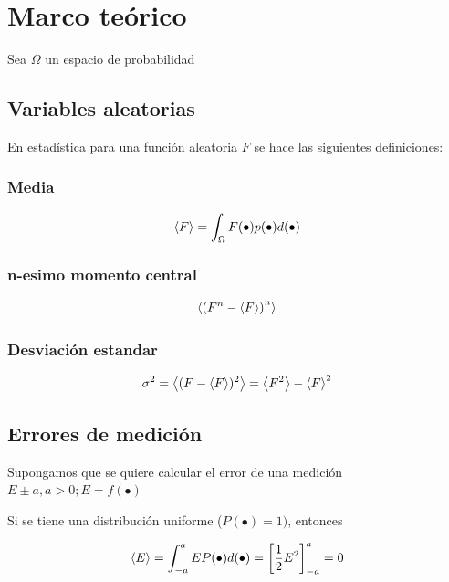 \section{Marco teórico}

Sea $\Omega$ un espacio de probabilidad

\subsection{Variables aleatorias}
En estadística para una función aleatoria $F$ se hace las
siguientes definiciones:

\subsubsection{Media}
\begin{equation}
    \label{eq:media}
    \left\langle F\right\rangle = \int_{\Omega}F(\bullet)p(\bullet)d(\bullet) 
\end{equation}

\subsubsection{n-esimo momento central}

\begin{equation}
    \label{eq:n-momento}
    \left\langle\left(F^n - \left\langle F\right\rangle\right)^n\right\rangle
\end{equation}

\subsubsection{Desviación estandar}
\begin{equation}
    \label{eq:std}
    \sigma^2 = \left\langle(F - \left\langle F\right\rangle)^2\right\rangle = \left\langle F^2\right\rangle - \left\langle F\right\rangle^2 
\end{equation}

\subsection{Errores de medición}
Supongamos que se quiere calcular el error de una medición
$E \pm a, a > 0; E = f(\bullet)$

Si se tiene una distribución uniforme ($P(\bullet) = 1)$, entonces

\begin{equation*}
    \left\langle E\right\rangle = \int_{-a}^{a}E P(\bullet) d(\bullet) = 
    \left[
    \frac{1}{2} E^2
    \right]_{-a}^{a} = 0
\end{equation*}

